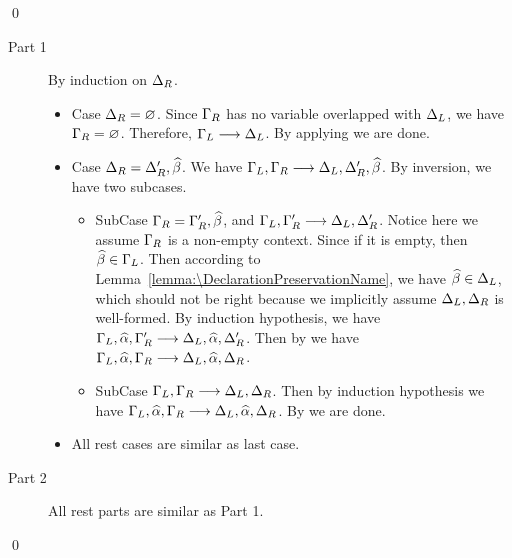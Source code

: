 \qed

\begin{lemma}[\ParallelAdmissibilityName]\leavevmode
  \label{lemma:\ParallelAdmissibilityName}
  \ParallelAdmissibilityBody
\end{lemma}

\proof

\begin{description}
  \item [Part 1] By induction on $\Delta_R$.
    \begin{itemize}
    \item Case $\Delta_R = \varnothing$.
      Since $\Gamma_R$ has no variable overlapped with $\Delta_L$,
      we have $\Gamma_R = \varnothing$.
      Therefore, $\Gamma_L \longrightarrow \Delta_L$.
      By applying  we are done.
    \item Case $\Delta_R = \Delta_R', \widehat{\beta}$.
      We have $\Gamma_L, \Gamma_R \longrightarrow \Delta_L, \Delta_R', \widehat{\beta}$.
      By inversion, we have two subcases.
      \begin{itemize}
      \item SubCase $\Gamma_R = \Gamma_R', \widehat{\beta}$,
        and $\Gamma_L, \Gamma_R' \longrightarrow \Delta_L, \Delta_R'$.
        Notice here we assume $\Gamma_R$ is a non-empty context.
        Since if it is empty, then $\widehat{\beta} \in \Gamma_L$.
        Then according to Lemma~\ref{lemma:\DeclarationPreservationName},
        we have $\widehat{\beta} \in \Delta_L$, which should not be right because we
        implicitly assume $\Delta_L, \Delta_R$ is well-formed.
        By induction hypothesis,
        we have $\Gamma_L, \widehat{\alpha}, \Gamma_R' \longrightarrow \Delta_L, \widehat{\alpha}, \Delta_R'$.
        Then by 
        we have $\Gamma_L, \widehat{\alpha}, \Gamma_R \longrightarrow \Delta_L, \widehat{\alpha}, \Delta_R$.
      \item SubCase $\Gamma_L, \Gamma_R \longrightarrow \Delta_L, \Delta_R$.
        Then by induction hypothesis we have
        $\Gamma_L, \widehat{\alpha}, \Gamma_R \longrightarrow \Delta_L, \widehat{\alpha}, \Delta_R$.
        By  we are done.
      \end{itemize}
    \item All rest cases are similar as last case.
    \end{itemize}
  \item [Part 2] All rest parts are similar as Part 1.
\end{description}

\qed

\begin{lemma}[\ParallelExtensionSolutionName]\leavevmode
  \label{lemma:\ParallelExtensionSolutionName}
  \ParallelExtensionSolutionBody
\end{lemma}

